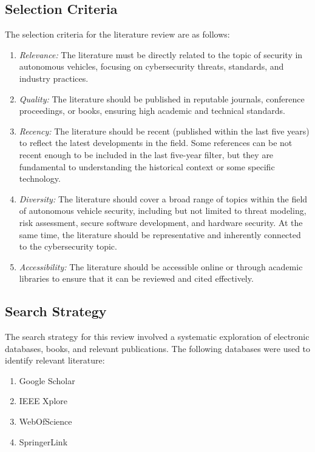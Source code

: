 \subsection{Selection Criteria}\label{subsec:selection-criteria}

The selection criteria for the literature review are as follows:
\begin{enumerate}
    \item \textit{Relevance:} The literature must be directly related to the topic of security in autonomous vehicles, focusing on cybersecurity threats, standards, and industry practices.
    \item \textit{Quality:} The literature should be published in reputable journals, conference proceedings, or books, ensuring high academic and technical standards.
    \item \textit{Recency:} The literature should be recent (published within the last five years) to reflect the latest developments in the field.
    Some references can be not recent enough to be included in the last five-year filter, but they are fundamental to understanding the historical context or some specific technology.
    \item \textit{Diversity:} The literature should cover a broad range of topics within the field of autonomous vehicle security, including but not limited to threat modeling, risk assessment, secure software development, and hardware security.
    At the same time, the literature should be representative and inherently connected to the cybersecurity topic.
    \item \textit{Accessibility:} The literature should be accessible online or through academic libraries to ensure that it can be reviewed and cited effectively.
\end{enumerate}

\subsection{Search Strategy}\label{subsec:search-strategy}

The search strategy for this review involved a systematic exploration of electronic databases, books, and relevant publications.
The following databases were used to identify relevant literature:

\begin{enumerate}
    \item Google Scholar
    \item IEEE Xplore
    \item WebOfScience
    \item SpringerLink
\end{enumerate}

